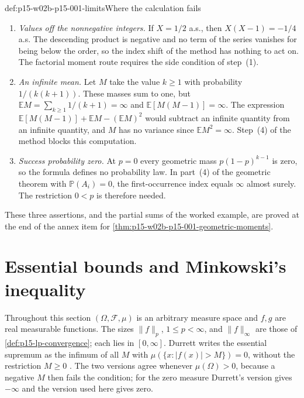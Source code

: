 \begin{hbwarning}{def:p15-w02b-p15-001-limits}{Where the calculation fails}
\par\nobreak
\begin{enumerate}
\item \emph{Values off the nonnegative integers.} If \(X=1/2\) a.s.,
      then \(X(X-1)=-1/4\) a.s. The descending product is negative and
      no term of the series vanishes for being below the order, so the
      index shift of the method has nothing to act on. The factorial
      moment route requires the side condition of step~(1).
\item \emph{An infinite mean.} Let \(M\) take the value \(k\geq1\) with
      probability \(1/(k(k+1))\). These masses sum to one, but
      \(\mathbb EM=\sum_{k\geq1}1/(k+1)=\infty\) and
      \(\mathbb E[M(M-1)]=\infty\). The expression
      \(\mathbb E[M(M-1)]+\mathbb EM-(\mathbb EM)^2\) would subtract an
      infinite quantity from an infinite quantity, and \(M\) has no
      variance since \(\mathbb EM^2=\infty\). Step~(4) of the method
      blocks this computation.
\item \emph{Success probability zero.} At \(p=0\) every geometric mass
      \(p(1-p)^{k-1}\) is zero, so the formula defines no probability
      law. In part~(4) of the geometric theorem with
      \(\mathbb P(A_i)=0\), the first-occurrence index equals \(\infty\)
      almost surely. The restriction \(0<p\) is therefore needed.
\end{enumerate}
These three assertions, and the partial sums of the worked example, are
proved at the end of the annex item for
\cref{thm:p15-w02b-p15-001-geometric-moments}.
\end{hbwarning}

\section{Essential bounds and Minkowski's inequality}
\label{sec:p15-w02b-p15-001-lp}

Throughout this section \((\Omega,\mathcal F,\mu)\) is an arbitrary
measure space and \(f,g\) are real measurable functions. The sizes
\(\|f\|_p\), \(1\leq p<\infty\), and \(\|f\|_\infty\) are those of
\cref{def:p15-lp-convergence}; each lies in \([0,\infty]\).
Durrett writes the essential supremum as the infimum of all \(M\) with
\(\mu(\{x:|f(x)|>M\})=0\), without the restriction \(M\geq0\)
\cite[Exercise~1.5.1, p.~28]{DurrettPTEAuthor2019}. The two versions
agree whenever \(\mu(\Omega)>0\), because a negative \(M\) then fails
the condition; for the zero measure Durrett's version gives
\(-\infty\) and the version used here gives zero.

